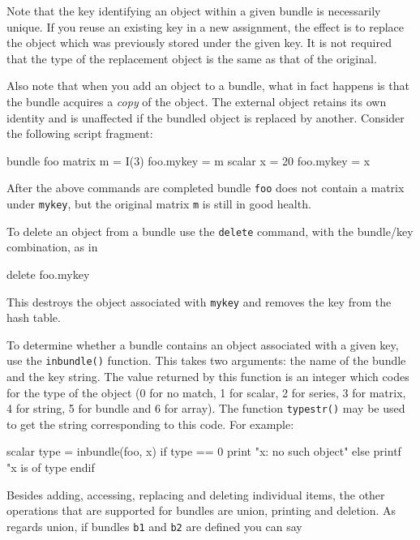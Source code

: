 Note that the key identifying an object within a given bundle is
necessarily unique. If you reuse an existing key in a new assignment,
the effect is to replace the object which was previously stored under
the given key. It is not required that the type of the replacement
object is the same as that of the original.

Also note that when you add an object to a bundle, what in fact
happens is that the bundle acquires a \textit{copy} of the object. The
external object retains its own identity and is unaffected if the
bundled object is replaced by another. Consider the following script
fragment:

\begin{code}
bundle foo
matrix m = I(3)
foo.mykey = m
scalar x = 20
foo.mykey = x
\end{code}

After the above commands are completed bundle \texttt{foo} does not
contain a matrix under \texttt{mykey}, but the original matrix
\texttt{m} is still in good health.

To delete an object from a bundle use the \texttt{delete} command,
with the bundle/key combination, as in

\begin{code}
delete foo.mykey
\end{code}

This destroys the object associated with \texttt{mykey} and removes
the key from the hash table.

To determine whether a bundle contains an object associated with a
given key, use the \texttt{inbundle()} function. This takes two
arguments: the name of the bundle and the key string. The value
returned by this function is an integer which codes for the type of
the object (0 for no match, 1 for scalar, 2 for series, 3 for matrix,
4 for string, 5 for bundle and 6 for array). The function
\texttt{typestr()} may be used to get the string corresponding to this
code. For example:

\begin{code}
scalar type = inbundle(foo, x)
if type == 0
  print "x: no such object"
else
  printf "x is of type %
endif
\end{code}

Besides adding, accessing, replacing and deleting individual items,
the other operations that are supported for bundles are union,
printing and deletion. As regards union, if bundles \texttt{b1} and
\texttt{b2} are defined you can say

